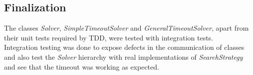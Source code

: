 \subsection{Finalization}
The classes \emph{Solver}, \emph{SimpleTimeoutSolver} and \emph{GeneralTimeoutSolver}, apart from their unit tests required by TDD, were tested with integration tests.  \\
Integration testing was done to expose defects in the communication of classes and also test the \emph{Solver} hierarchy with real implementations of \emph{SearchStrategy} and see that the timeout was working as expected. 
